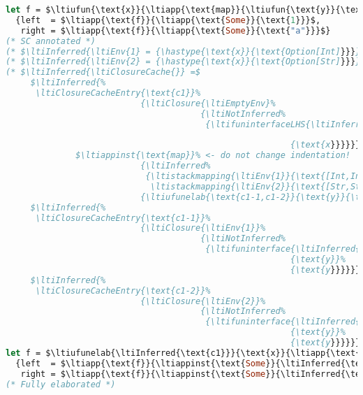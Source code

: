 {
\singlespacing
\begin{lstlisting}[language=ml,mathescape=true]
let f = $\ltiufun{\text{x}}{\ltiapp{\text{map}}{\ltiufun{\text{y}}{\text{y}},\text{x}}}$ in
  {left  = $\ltiapp{\text{f}}{\ltiapp{\text{Some}}{\text{1}}}$,
   right = $\ltiapp{\text{f}}{\ltiapp{\text{Some}}{\text{"a"}}}$}
(* SC annotated *)
(* $\ltiInferred{\ltiEnv{1} = {\hastype{\text{x}}{\text{Option[Int]}}}}$ *)
(* $\ltiInferred{\ltiEnv{2} = {\hastype{\text{x}}{\text{Option[Str]}}}}$ *)
(* $\ltiInferred{\ltiClosureCache{}} =$
     $\ltiInferred{%
      \ltiClosureCacheEntry{\text{c1}}%
                           {\ltiClosure{\ltiEmptyEnv}%
                                       {\ltiNotInferred%
                                        {\ltifuninterfaceLHS{\ltiInferred{\ltiIFn{\ltiFn{\text{Option[Int]}}{\text{Option[Int]}}%
                                                                                  \ltiFn{\text{Option[Str]}}{\text{Option[Str]}}}}}%
                                                         {\text{x}}}}}}$
              $\ltiappinst{\text{map}}% <- do not change indentation!
                           {\ltiInferred%
                            {\ltistackmapping{\ltiEnv{1}}{\text{[Int,Int]}},%
                             \ltistackmapping{\ltiEnv{2}}{\text{[Str,Str]}}}}%
                           {\ltiufunelab{\text{c1-1,c1-2}}{\text{y}}{\text{y}},\text{x}}$
     $\ltiInferred{%
      \ltiClosureCacheEntry{\text{c1-1}}%
                           {\ltiClosure{\ltiEnv{1}}%
                                       {\ltiNotInferred%
                                        {\ltifuninterface{\ltiInferred{\ltiFn{\text{Int}}{\text{Int}}}}%
                                                         {\text{y}}%
                                                         {\text{y}}}}}}$
     $\ltiInferred{%
      \ltiClosureCacheEntry{\text{c1-2}}%
                           {\ltiClosure{\ltiEnv{2}}%
                                       {\ltiNotInferred%
                                        {\ltifuninterface{\ltiInferred{\ltiFn{\text{Str}}{\text{Str}}}}%
                                                         {\text{y}}%
                                                         {\text{y}}}}}}$ *)
let f = $\ltiufunelab{\ltiInferred{\text{c1}}}{\text{x}}{\ltiapp{\text{map}}{\ltiufunelab{\ltiInferred{\text{c1-1,c1-2}}}{\text{y}}{\text{y}},\text{x}}}$ in
  {left  = $\ltiapp{\text{f}}{\ltiappinst{\text{Some}}{\ltiInferred{\text{Int}}}{\text{1}}}$,
   right = $\ltiapp{\text{f}}{\ltiappinst{\text{Some}}{\ltiInferred{\text{Str}}}{\text{"a"}}}$}
(* Fully elaborated *)

\end{lstlisting}}
